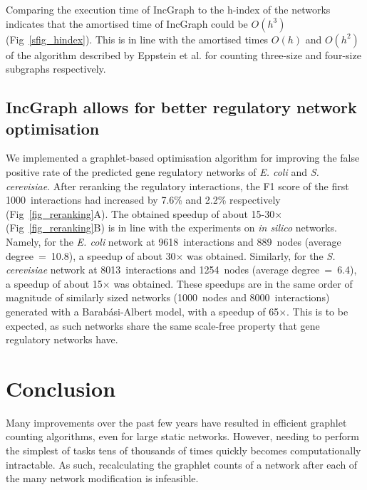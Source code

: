 Comparing the execution time of IncGraph to the h-index of the networks indicates that the amortised time of IncGraph could be $O(h^3)$ (Fig~\ref{sfig_hindex}). This is in line with the amortised times $O(h)$ and $O(h^2)$ of the algorithm described by Eppstein et al. \cite{eppstein_extendeddynamicsubgraph_2012} for counting three-size and four-size subgraphs respectively.

\subsection*{IncGraph allows for better regulatory network optimisation}
We implemented a graphlet-based optimisation algorithm for improving the false positive rate of the predicted gene regulatory networks of \textit{E. coli} and \textit{S. cerevisiae}. After reranking the regulatory interactions, the F1 score of the first 1000~interactions had increased by 7.6\% and 2.2\% respectively (Fig~\ref{fig_reranking}A). The obtained speedup of about 15-30$\times$ (Fig~\ref{fig_reranking}B) is in line with the experiments on \textit{in silico} networks.
Namely, for the \textit{E. coli} network at 9618~interactions and 889~nodes (average degree~=~10.8), a speedup of about 30$\times$ was obtained.
Similarly, for the \textit{S. cerevisiae} network at 8013~interactions and 1254~nodes (average degree~=~6.4), a speedup of about 15$\times$ was obtained.
These speedups are in the same order of magnitude of similarly sized networks (1000~nodes and 8000~interactions) generated with a Barab\'asi-Albert model, with a speedup of 65$\times$. This is to be expected, as such networks share the same scale-free property that gene regulatory networks have.



\section*{Conclusion}
Many improvements over the past few years have resulted in efficient graphlet counting algorithms, even for large static networks. However, needing to perform the simplest of tasks tens of thousands of times quickly becomes computationally intractable. As such, recalculating the graphlet counts of a network after each of the many network modification is infeasible.

